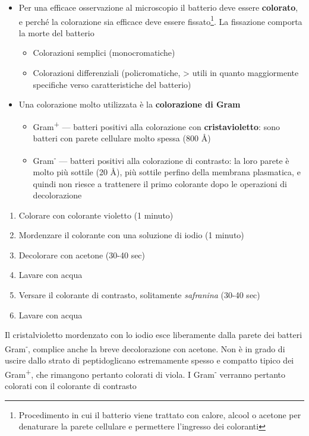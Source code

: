 \documentclass[italian,]{article}
\providecommand{\tightlist}{%
  \setlength{\itemsep}{0pt}\setlength{\parskip}{0pt}}
\newcommand{\normalbox}[2]{\begin{tcolorbox}[title=#1]#2\end{tcolorbox}} %
\begin{document}
\begin{itemize}
\tightlist
\item
  Per una efficace osservazione al microscopio il batterio deve essere
  \textbf{colorato}, e perché la colorazione sia efficace deve essere
  fissato\footnote{Procedimento in cui il batterio viene trattato con
    calore, alcool o acetone per denaturare la parete cellulare e
    permettere l'ingresso dei coloranti}. La fissazione comporta la
  morte del batterio

  \begin{itemize}
  \tightlist
  \item
    Colorazioni semplici (monocromatiche)
  \item
    Colorazioni differenziali (policromatiche, \textgreater{} utili in
    quanto maggiormente specifiche verso caratteristiche del batterio)
  \end{itemize}
\item
  Una colorazione molto utilizzata è la \textbf{colorazione di Gram}

  \begin{itemize}
  \tightlist
  \item
    Gram\textsuperscript{+} --- batteri positivi alla colorazione con
    \textbf{cristavioletto}: sono batteri con parete cellulare molto
    spessa (800 Å)
  \item
    Gram\textsuperscript{-} --- batteri positivi alla colorazione di
    contrasto: la loro parete è molto più sottile (20 Å), più sottile
    perfino della membrana plasmatica, e quindi non riesce a trattenere
    il primo colorante dopo le operazioni di decolorazione
  \end{itemize}
\end{itemize}

\normalbox{Procedimento per la colorazione di Gram}{
\begin{enumerate} \def\labelenumi{\arabic{enumi}.} \tightlist \item Colorare con colorante violetto (1 minuto) \item Mordenzare il colorante con una soluzione di iodio (1 minuto) \item Decolorare con acetone (30-40 sec) \item Lavare con acqua \item Versare il colorante di contrasto, solitamente \emph{safranina} (30-40 sec) \item Lavare con acqua \end{enumerate}

\tcblower

Il cristalvioletto mordenzato con lo iodio esce liberamente dalla parete dei batteri Gram\textsuperscript{-}, complice anche la breve decolorazione con acetone. Non è in grado di uscire dallo strato di peptidoglicano estremamente spesso e compatto tipico dei Gram\textsuperscript{+}, che rimangono pertanto colorati di viola. I Gram\textsuperscript{-} verranno pertanto colorati con il colorante di contrasto
}
\end{document}
